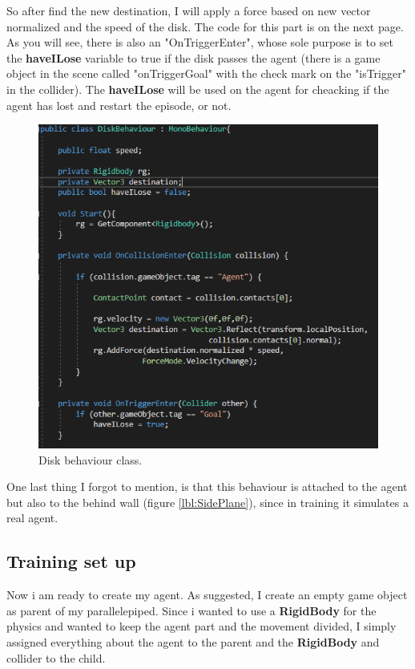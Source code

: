 \documentclass[12pt]{article}
\begin{document}
	\noindent
	So after find the new destination, I will apply a force based on new vector normalized and the speed of the disk.
	The code for this part is on the next page. As you will see, there is also an "OnTriggerEnter", whose sole purpose is to set the \textbf{haveILose} variable to true if the disk passes the agent (there is a game object in the scene called "onTriggerGoal" with the check mark on the "isTrigger" in the collider). The  \textbf{haveILose} will be used on the agent for cheacking if the agent has lost and restart the episode, or not.
	
	\newpage
	
	\begin{figure}[hbt!]
		\centering
		\includegraphics[width= 1
		\textwidth]{images/DiskBehaviour1.png}
		\caption{Disk behaviour class.}
		\label{lbl:reflect}
	\end{figure} 
	
	\noindent
	One last thing I forgot to mention, is that this behaviour is attached to the agent but also to the behind wall (figure \ref{lbl:SidePlane}), since in training it simulates a real agent.
	
	\subsection{Training set up}
	Now i am ready to create my agent. As suggested, I create an empty game object as parent of my parallelepiped. Since i wanted to use a \textbf{RigidBody} for the physics and wanted to keep the agent part and the movement divided,  I simply assigned everything about the agent to the parent and the \textbf{RigidBody} and collider to the child.  
	
\end{document}
